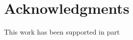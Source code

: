 \documentclass{sig-alternate}
\begin{document}
\section{Acknowledgments}
This work has been supported in part %

%



\end{document}
